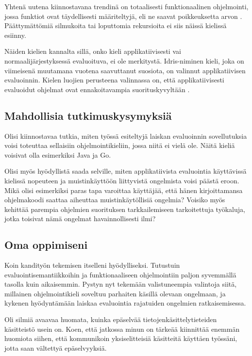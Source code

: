 Yhtenä uutena kiinnostavana trendinä on totaalisesti funktionaalinen ohjelmointi, jossa funktiot ovat täydellisesti määriteltyjä, eli ne saavat poikkeuksetta arvon \citep{turner2004total}. Päättymättömiä silmukoita tai loputtomia rekursioita ei siis näissä kielissä esiinny.

Näiden kielien kannalta sillä, onko kieli applikatiivisesti vai normaalijärjestyksessä evaluoituva, ei ole merkitystä. Idris-niminen kieli, joka on viimeisenä muutamana vuotena saavuttanut suosiota, on valinnut applikatiivisen evaluoinnin. Kielen luojien perusteena valinnassa on, että applikatiivisesti evaluoidut ohjelmat ovat ennakoitavampia suorituskyvyltään \citep{idrisfaqwhynotlazy}.

\subsection{Mahdollisia tutkimuskysymyksiä}
Olisi kiinnostavaa tutkia, miten työssä esiteltyjä laiskan evaluoinnin sovellutuksia voisi toteuttaa sellaisiin ohjelmointikieliin, jossa niitä ei vielä ole. Näitä kieliä voisivat olla esimerkiksi Java ja Go.

Olisi myös hyödyllistä saada selville, miten applikatiivista evaluointia käyttävissä kielissä nopeuteen ja muistinkäyttöön liittyvistä ongelmista voisi päästä eroon. Mikä olisi esimerkiksi paras tapa varoittaa käyttäjää, että hänen kirjoittamansa ohjelmakoodi saattaa aiheuttaa muistinkäytöllisiä ongelmia? Voisiko myös kehittää parempia ohjelmien suorituksen tarkkailemiseen tarkoitettuja työkaluja, jotka toisivat nämä ongelmat havainnollisesti ilmi?

\subsection{Oma oppimiseni}

Koin kandityön tekemisen itselleni hyödylliseksi. Tutustuin evaluointisemantiikkoihin ja funktionaaliseen ohjelmointiin paljon syvemmällä tasolla kuin aikaisemmin. Pystyn nyt tekemään valistuneempia valintoja siitä, millainen ohjelmointikieli soveltuu parhaiten käsillä olevaan ongelmaan, ja kykenen hyödyntämään laiskaa evaluointia rajatuiden ongelmien ratkaisemisessa.

Oli silmiä avaavaa huomata, kuinka epäselvää tietojenkäsittelytieteiden käsitteistö usein on. Koen, että jatkossa minun on tärkeää kiinnittää enemmän huomiota siihen, että kommunikoin yksiselitteisiä käsitteitä käyttäen työssäni, jotta saan vältettyä epäselvyyksiä.